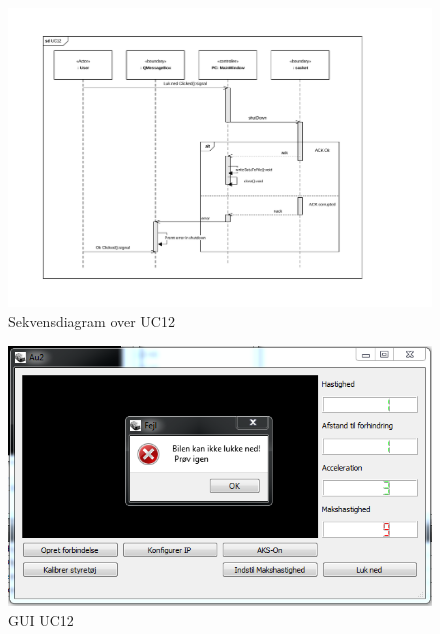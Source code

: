 \begin{figure}[H]
\centering
\includegraphics[width=\textwidth* 2/3,height=\textwidth* 4/10 ]{../fig/diagrammer/pc/sd_uc12.pdf}
\caption{Sekvensdiagram over UC12}
\label{fig:cd_uc12}
\end{figure}

\begin{figure}[H]
\centering
\includegraphics[width=\textwidth* 3/4,height=\textwidth* 9/20 ]{../fig/billeder/gui_uc12.png}
\caption{GUI UC12}
\label{fig:GUI_uc12}
\end{figure}

